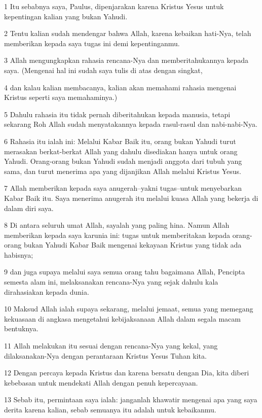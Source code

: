 \par 1 Itu sebabnya saya, Paulus, dipenjarakan karena Kristus Yesus untuk kepentingan kalian yang bukan Yahudi.
\par 2 Tentu kalian sudah mendengar bahwa Allah, karena kebaikan hati-Nya, telah memberikan kepada saya tugas ini demi kepentinganmu.
\par 3 Allah mengungkapkan rahasia rencana-Nya dan memberitahukannya kepada saya. (Mengenai hal ini sudah saya tulis di atas dengan singkat,
\par 4 dan kalau kalian membacanya, kalian akan memahami rahasia mengenai Kristus seperti saya memahaminya.)
\par 5 Dahulu rahasia itu tidak pernah diberitahukan kepada manusia, tetapi sekarang Roh Allah sudah menyatakannya kepada rasul-rasul dan nabi-nabi-Nya.
\par 6 Rahasia itu ialah ini: Melalui Kabar Baik itu, orang bukan Yahudi turut merasakan berkat-berkat Allah yang dahulu disediakan hanya untuk orang Yahudi. Orang-orang bukan Yahudi sudah menjadi anggota dari tubuh yang sama, dan turut menerima apa yang dijanjikan Allah melalui Kristus Yesus.
\par 7 Allah memberikan kepada saya anugerah--yakni tugas--untuk menyebarkan Kabar Baik itu. Saya menerima anugerah itu melalui kuasa Allah yang bekerja di dalam diri saya.
\par 8 Di antara seluruh umat Allah, sayalah yang paling hina. Namun Allah memberikan kepada saya karunia ini: tugas untuk memberitakan kepada orang-orang bukan Yahudi Kabar Baik mengenai kekayaan Kristus yang tidak ada habisnya;
\par 9 dan juga supaya melalui saya semua orang tahu bagaimana Allah, Pencipta semesta alam ini, melaksanakan rencana-Nya yang sejak dahulu kala dirahasiakan kepada dunia.
\par 10 Maksud Allah ialah supaya sekarang, melalui jemaat, semua yang memegang kekuasaan di angkasa mengetahui kebijaksanaan Allah dalam segala macam bentuknya.
\par 11 Allah melakukan itu sesuai dengan rencana-Nya yang kekal, yang dilaksanakan-Nya dengan perantaraan Kristus Yesus Tuhan kita.
\par 12 Dengan percaya kepada Kristus dan karena bersatu dengan Dia, kita diberi kebebasan untuk mendekati Allah dengan penuh kepercayaan.
\par 13 Sebab itu, permintaan saya ialah: janganlah khawatir mengenai apa yang saya derita karena kalian, sebab semuanya itu adalah untuk kebaikanmu.
